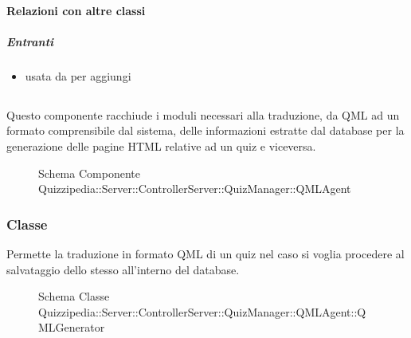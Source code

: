 \paragraph{Relazioni con altre classi}
\subparagraph{Entranti}
\begin{itemize}
\item usata da  per aggiungi
\end{itemize}
\subsection{}
Questo componente racchiude i moduli necessari alla traduzione, da QML ad un formato comprensibile dal sistema, delle informazioni estratte dal database per la generazione delle pagine HTML relative ad un quiz e viceversa.
\begin{figure}[H]
\centering
\noindent{}
\caption[Schema Componente Quizzipedia::Server::ControllerServer::QuizManager::QMLAgent]{Schema Componente Quizzipedia::Server::ControllerServer::QuizManager::QMLAgent}
\end{figure}
\subsubsection{Classe }
Permette la traduzione in formato QML di un quiz nel caso si voglia procedere al salvataggio dello stesso all'interno del database.
\begin{figure}[H]
\centering
\noindent{}
\caption[Schema Classe QMLGenerator]{Schema Classe Quizzipedia::Server::ControllerServer::QuizManager::QMLAgent::QMLGenerator}
\end{figure}
